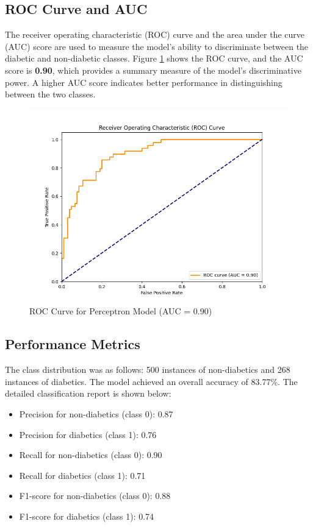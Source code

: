 \documentclass[10pt,twocolumn,letterpaper]{article}
\begin{document}
\subsection{ROC Curve and AUC}
The receiver operating characteristic (ROC) curve and the area under the curve (AUC) score are used to measure the model's ability to discriminate between the diabetic and non-diabetic classes. Figure \ref{fig:roc_curve} shows the ROC curve, and the AUC score is \textbf{0.90}, which provides a summary measure of the model’s discriminative power. A higher AUC score indicates better performance in distinguishing between the two classes.

\begin{figure}[h]
    \centering
    \includegraphics[width=\linewidth]{roc_curve.png}
    \caption{ROC Curve for Perceptron Model (AUC = 0.90)}
    \label{fig:roc_curve}
\end{figure}

\subsection{Performance Metrics}
The class distribution was as follows: 500 instances of non-diabetics and 268 instances of diabetics. The model achieved an overall accuracy of 83.77\%. The detailed classification report is shown below:

\begin{itemize}
    \item Precision for non-diabetics (class 0): 0.87
    \item Precision for diabetics (class 1): 0.76
    \item Recall for non-diabetics (class 0): 0.90
    \item Recall for diabetics (class 1): 0.71
    \item F1-score for non-diabetics (class 0): 0.88
    \item F1-score for diabetics (class 1): 0.74
\end{itemize}
\end{document}
